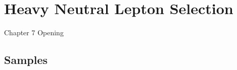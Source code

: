 \chapter{Heavy Neutral Lepton Selection}
\label{ChapterSelection}

\ifpdf
    \graphicspath{{Chapter7/Figs/Raster/}{Chapter7/Figs/PDF/}{Chapter7/Figs/}}
\else
    \graphicspath{{Chapter7/Figs/Vector/}{Chapter7/Figs/}}
\fi


Chapter 7 Opening
\newpage

\section{Samples}
